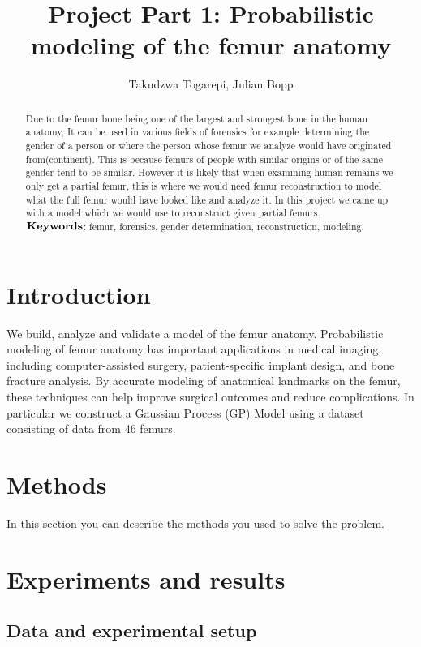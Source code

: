 \documentclass[10pt]{article}
\author{Takudzwa Togarepi, Julian Bopp }
\title{Project Part 1: Probabilistic modeling of the femur anatomy}
\begin{document}
\maketitle
\begin{abstract}
Due to the femur bone being one of the largest and strongest bone in the human anatomy, It can be used in various fields of forensics for example determining the gender of a person or where the person whose femur we analyze would have originated from(continent). This is because femurs of people with similar origins or of the same gender tend to be similar. However it is likely that when examining human remains we only get a partial femur, this is where we would need femur reconstruction to model what the full femur would have looked like and analyze it. In this project we came up with a model which we would use to reconstruct given partial femurs.\\
$\bold{Keywords}$: femur, forensics, gender determination, reconstruction, modeling.
\end{abstract}

\section{Introduction}

We build, analyze and validate a model of the femur anatomy. Probabilistic modeling of femur anatomy has important applications in medical imaging, including computer-assisted surgery, patient-specific implant design, and bone fracture analysis. By accurate modeling of anatomical landmarks on the femur, these techniques can help improve surgical outcomes and reduce complications. In particular we construct a Gaussian Process (GP) Model using a dataset consisting of data from 46 femurs.
\section{Methods}

In this section you can describe the methods you used to solve the problem.

\newpage
\section{Experiments and results}
\subsection{Data and experimental setup}
\end{document}

